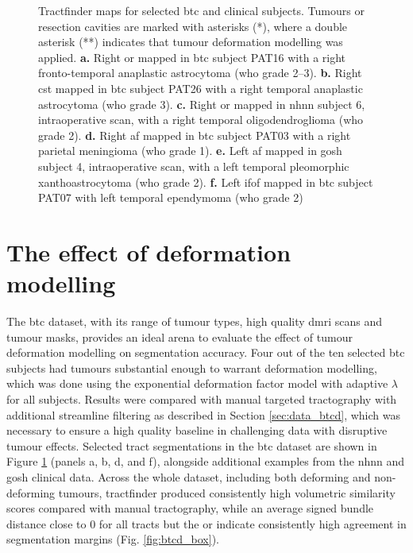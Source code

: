 \begin{figure}
  
  \caption[Example tractfinder results in tumour patients]{Tractfinder maps for selected \gls{btc} and clinical subjects. Tumours or resection cavities are marked with asterisks (*), where a double asterisk (**) indicates that tumour deformation modelling was applied.
  \textbf{\sffamily a.} Right \gls{or} mapped in \gls{btc} subject PAT16 with a right fronto-temporal anaplastic astrocytoma (\gls{who} grade 2--3).
  \textbf{\sffamily b.} Right \gls{cst} mapped in \gls{btc} subject PAT26 with a right temporal anaplastic astrocytoma (\gls{who} grade 3).
  \textbf{\sffamily c.} Right \gls{or} mapped in \gls{nhnn} subject 6, intraoperative scan, with a right temporal oligodendroglioma (\gls{who} grade 2).
  \textbf{\sffamily d.} Right \gls{af} mapped in \gls{btc} subject PAT03 with a right parietal meningioma (\gls{who} grade 1).
  \textbf{\sffamily e.} Left \gls{af} mapped in \gls{gosh} subject 4, intraoperative scan, with a left temporal pleomorphic xanthoastrocytoma (\gls{who} grade 2).
  \textbf{\sffamily f.} Left \gls{ifof} mapped in \gls{btc} subject PAT07 with left temporal ependymoma (\gls{who} grade 2)}
  \label{fig:tumours}
\end{figure}

\section{The effect of deformation modelling}
\label{sec:btcd}

The \gls{btc} dataset, with its range of tumour types, high quality \gls{dmri} scans and tumour masks, provides an ideal arena to evaluate the effect of tumour deformation modelling on segmentation accuracy.
Four out of the ten selected \gls{btc} subjects had tumours substantial enough to warrant deformation modelling, which was done using the exponential deformation factor model with adaptive $\lambda$ for all subjects.
Results were compared with manual targeted tractography with additional streamline filtering as described in Section \ref{sec:data_btcd}, which was necessary to ensure a high quality baseline in challenging data with disruptive tumour effects.
Selected tract segmentations in the \gls{btc} dataset are shown in Figure \ref{fig:tumours} (panels a, b, d, and f), alongside additional examples from the \gls{nhnn} and \gls{gosh} clinical data.
Across the whole dataset, including both deforming and non-deforming tumours, tractfinder produced consistently high volumetric similarity scores compared with manual tractography, while an average signed bundle distance close to 0 for all tracts but the \gls{or} indicate consistently high agreement in segmentation margins (Fig. \ref{fig:btcd_box}).


